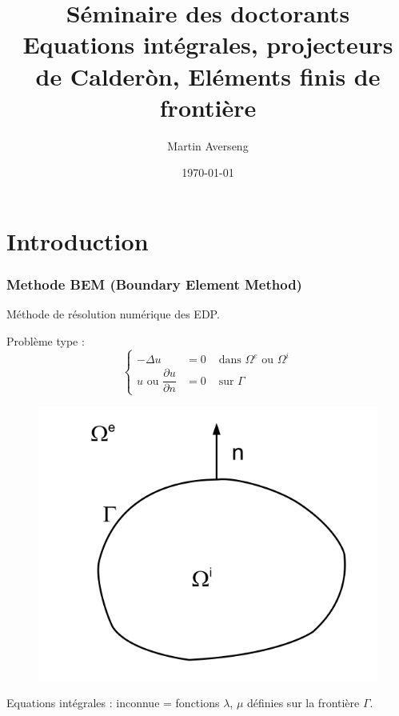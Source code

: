 \documentclass[11pt]{beamer}
\author{Martin Averseng}
\title{\textbf{Séminaire des doctorants}\\
		Equations intégrales, projecteurs de Calderòn, Eléments finis de frontière}
\date{\today}
\institute{CMAP, Ecole Polytechnique}
\begin{document}
	\maketitle

	\section{Introduction}
	\setcounter{subsection}{1}
	\begin{frame}
		\frametitle{Methode BEM (Boundary Element Method)}
		Méthode de résolution numérique des EDP.
		\begin{minipage}{0.69\textwidth}
			Problème type : 
			\begin{equation*}
			\left\{
				\begin{aligned}
				-\Delta u &= 0 & \text{ dans } \Omega^e \text{ ou } \Omega^i\\
				u \text{ ou }\dfrac{\partial u}{\partial n} &= 0 & \text{ sur } \Gamma
				\end{aligned}
				\right.
			\end{equation*}
		\end{minipage}
		\begin{minipage}{0.29\textwidth}
			\begin{figure}
				\centering
				\includegraphics[scale = 0.2]{SchemaDomaine}
			\end{figure}
		\end{minipage}
		\begin{minipage}{0.69\textwidth}
			Equations intégrales : inconnue = fonctions $\lambda$, $\mu$ définies sur la frontière $\Gamma$.\\

\end{minipage}
\end{frame}
\end{document}
